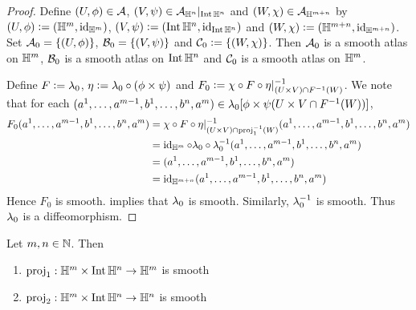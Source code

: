 \documentclass{book}
\begin{document}
\begin{proof}
	Define $(U, \phi) \in \mathcal{A}$, $(V, \psi) \in \mathcal{A}_{\mathbb{H}^n}|_{\operatorname{Int} \mathbb{H}^n}$ and $(W, \chi) \in \mathcal{A}_{\mathbb{H}^{m+n}}$ by $(U, \phi) \vcentcolon= (\mathbb{H}^m, \operatorname{id}_{\mathbb{H}^m})$, $(V, \psi) \vcentcolon= (\operatorname{Int} \mathbb{H}^n, \operatorname{id}_{\operatorname{Int} \mathbb{H}^n})$ and $(W, \chi) \vcentcolon= (\mathbb{H}^{m+n}, \operatorname{id}_{\mathbb{H}^{m+n}})$. Set $\mathcal{A}_0 = \{(U, \phi)\}$, $\mathcal{B}_0 = \{(V, \psi)\}$ and $\mathcal{C}_0 \vcentcolon= \{(W, \chi)\}$. Then $\mathcal{A}_0$ is a smooth atlas on $\mathbb{H}^m$, $\mathcal{B}_0$ is a smooth atlas on $\operatorname{Int} \mathbb{H}^n$ and $\mathcal{C}_0$ is a smooth atlas on $\mathbb{H}^m$. 
	
	Define $F \vcentcolon= \lambda_0$, $\eta \vcentcolon= \lambda_0 \circ (\phi \times \psi)$ and $F_0 \vcentcolon= \chi \circ F \circ \eta|_{(U \times V) \cap F^{-1}(W)}^{-1}$. We note that for each $(a^1, \ldots, a^{m-1}, b^1, \ldots, b^n, a^m) \in \lambda_0[\phi \times \psi(U \times V \cap F^{-1}(W)) ]$, 
	\begin{align*}
		F_0 (a^1, \ldots, a^{m-1}, b^1, \ldots, b^n, a^m)
		& = \chi \circ F \circ \eta|_{(U \times V) \cap \operatorname{\text{proj}}_1^{-1}(W)}^{-1}(a^1, \ldots, a^{m-1}, b^1, \ldots, b^n, a^m) \\
		& = \operatorname{id}_{\mathbb{H}^m} \circ \lambda_0 \circ \lambda_0^{-1} (a^1, \ldots, a^{m-1}, b^1, \ldots, b^n, a^m)\\
		& = (a^1, \ldots, a^{m-1}, b^1, \ldots, b^n, a^m) \\
		& = \operatorname{id}_{\mathbb{H}^{m+n}}(a^1, \ldots, a^{m-1}, b^1, \ldots, b^n, a^m)
	\end{align*}
	Hence $F_0$ is smooth.  implies that $\lambda_0$ is smooth. Similarly, $\lambda_0^{-1}$ is smooth. Thus $\lambda_0$ is a diffeomorphism.
\end{proof}

\begin{ex} 
	Let $m,n \in \mathbb{N}$. Then  
	\begin{enumerate}
		\item $\operatorname{\text{proj}}_1: \mathbb{H}^m \times \operatorname{Int} \mathbb{H}^n \rightarrow \mathbb{H}^m$ is smooth
		\item $\operatorname{\text{proj}}_2: \mathbb{H}^m \times \operatorname{Int} \mathbb{H}^n \rightarrow \mathbb{H}^n$ is smooth
	\end{enumerate}
\end{ex}
\end{document}

